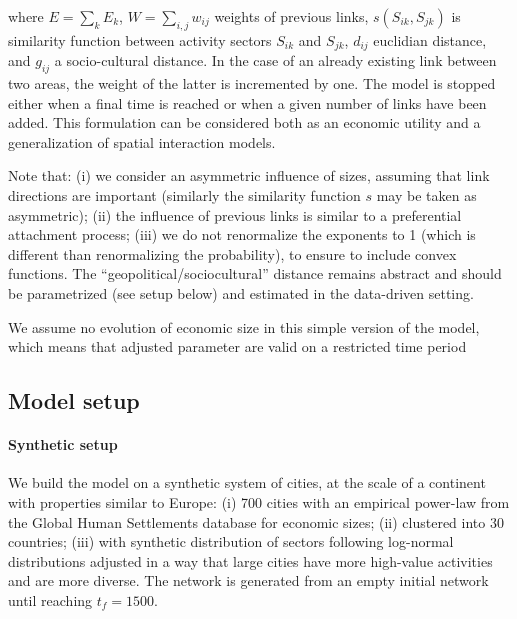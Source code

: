 \documentclass[11pt]{article}
\begin{document}
where $E  =  \sum_k E_k$, $W  = \sum_{i,j} w_{ij}$ weights of previous links, $s(S_{ik},S_{jk})$ is similarity function between activity sectors $S_{ik}$ and $S_{jk}$, $d_{ij}$ euclidian distance, and $g_{ij}$ a socio-cultural distance. In the case of an already existing link between two areas, the weight of the latter is incremented by one. The model is stopped either when a final time is reached or when a given number of links have been added. This formulation can be considered both as an economic utility and a generalization of spatial interaction models.



Note that: (i) we consider an asymmetric influence of sizes, assuming that link directions are important (similarly the similarity function $s$ may be taken as asymmetric); (ii) the influence of previous links is similar to a preferential attachment process; (iii) we do not renormalize the exponents to 1 (which is different than renormalizing the probability), to ensure to include convex functions. The ``geopolitical/sociocultural'' distance remains abstract and should be parametrized (see setup below) and estimated in the data-driven setting.


We assume no evolution of economic size in this simple version of the model, which means that adjusted parameter are valid on a restricted time period


\subsection{Model setup}

\paragraph{Synthetic setup}

We build the model on a synthetic system of cities, at the scale of a continent with properties similar to Europe: (i) 700 cities with an empirical power-law from the Global Human Settlements database for economic sizes; (ii) clustered into 30 countries; (iii) with synthetic distribution of sectors following log-normal distributions adjusted in a way that large cities have more high-value activities and are more diverse. The network is generated from an empty initial network until reaching $t_f=1500$.
\end{document}
